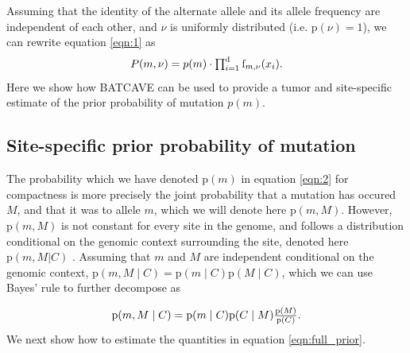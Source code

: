 \documentclass[a4,center,fleqn]{NAR}
\newcommand{\batcave}{BATCAVE }
\begin{document}
Assuming that the identity of the alternate allele and its allele frequency are independent of each other, and $\nu$ is uniformly distributed (i.e. $\mathrm{p}(\nu) = 1$), we can rewrite equation \ref{eqn:1} as
\begin{equation}
  \label{eqn:2}
$$
  P(m,\nu) = p(m) \cdot \prod_{i=1}^{\mathrm{d}} \textrm{f}_{m,\nu}(x_i).
$$
\end{equation}
Here we show how \batcave can be used to provide a tumor and site-specific estimate of the prior probability of mutation $p(m)$.

\subsection{Site-specific prior probability of mutation}
The probability which we have denoted $\mathrm{p}(m)$ in equation \ref{eqn:2} for compactness is more precisely the joint probability that a mutation has occured $M$, and that it was to allele $m$, which we will denote here $\mathrm{p}(m,M)$.
However, $\mathrm{p}(m,M)$ is not constant for every site in the genome, and follows a distribution conditional on the genomic context surrounding the site, denoted here $\mathrm{p}(m,M | C)$ \cite{Buisson2019}.
Assuming that $m$ and $M$ are independent conditional on the genomic context, $\mathrm{p}(m,M \mid C) = \mathrm{p}(m \mid C) \mathrm{p}(M \mid C)$, which we can use Bayes' rule to further decompose as 

\begin{equation}
  \label{eqn:full_prior}
  $$
  \mathrm{p}(m,M \mid C) = \mathrm{p}(m \mid C) \mathrm{p}(C \mid M)\frac{\mathrm{p}(M)}{\mathrm{p}(C)}.
  $$
\end{equation}
We next show how to estimate the quantities in equation \ref{eqn:full_prior}.
\end{document}
